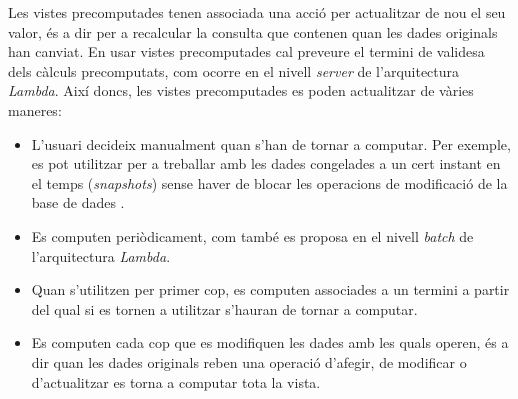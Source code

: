 Les vistes precomputades tenen associada una acció per actualitzar de
nou el seu valor, és a dir per a recalcular la consulta que contenen
quan les dades originals han canviat. En usar vistes precomputades cal
preveure el termini de validesa dels càlculs precomputats, com ocorre
en el nivell \emph{server} de l'arquitectura \emph{Lambda}. Així
doncs, les vistes precomputades es poden actualitzar de vàries
maneres:
\begin{itemize}

\item L'usuari decideix manualment quan s'han de tornar a
  computar. Per exemple, es pot utilitzar per a treballar amb les
  dades congelades a un cert instant en el temps (\emph{snapshots})
  sense haver de blocar les operacions de modificació de la base de
  dades \cite[\S{}10.5]{date04:introduction8}.

\item Es computen periòdicament, com també es proposa en el nivell
  \emph{batch} de l'arquitectura \emph{Lambda}.

\item Quan s'utilitzen per primer cop, es computen associades a un
  termini a partir del qual si es tornen a utilitzar s'hauran
  de tornar a computar. 


\item Es computen cada cop que es modifiquen les dades amb les quals
  operen, és a dir quan les dades originals reben una operació
  d'afegir, de modificar o d'actualitzar es torna a computar tota la
  vista.


\end{itemize}
